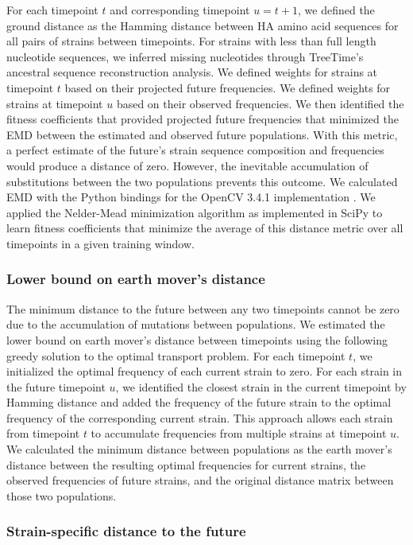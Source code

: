 For each timepoint $t$ and corresponding timepoint $u = t + 1$, we defined the ground distance as the Hamming distance between HA amino acid sequences for all pairs of strains between timepoints.
For strains with less than full length nucleotide sequences, we inferred missing nucleotides through TreeTime's ancestral sequence reconstruction analysis.
We defined weights for strains at timepoint $t$ based on their projected future frequencies.
We defined weights for strains at timepoint $u$ based on their observed frequencies.
We then identified the fitness coefficients that provided projected future frequencies that minimized the EMD between the estimated and observed future populations.
With this metric, a perfect estimate of the future's strain sequence composition and frequencies would produce a distance of zero.
However, the inevitable accumulation of substitutions between the two populations prevents this outcome.
We calculated EMD with the Python bindings for the OpenCV 3.4.1 implementation \cite{opencv_library}.
We applied the Nelder-Mead minimization algorithm as implemented in SciPy \cite{SciPy} to learn fitness coefficients that minimize the average of this distance metric over all timepoints in a given training window.

\subsubsection*{Lower bound on earth mover's distance}

The minimum distance to the future between any two timepoints cannot be zero due to the accumulation of mutations between populations.
We estimated the lower bound on earth mover's distance between timepoints using the following greedy solution to the optimal transport problem.
For each timepoint $t$, we initialized the optimal frequency of each current strain to zero.
For each strain in the future timepoint $u$, we identified the closest strain in the current timepoint by Hamming distance and added the frequency of the future strain to the optimal frequency of the corresponding current strain.
This approach allows each strain from timepoint $t$ to accumulate frequencies from multiple strains at timepoint $u$.
We calculated the minimum distance between populations as the earth mover's distance between the resulting optimal frequencies for current strains, the observed frequencies of future strains, and the original distance matrix between those two populations.

\subsubsection*{Strain-specific distance to the future}

